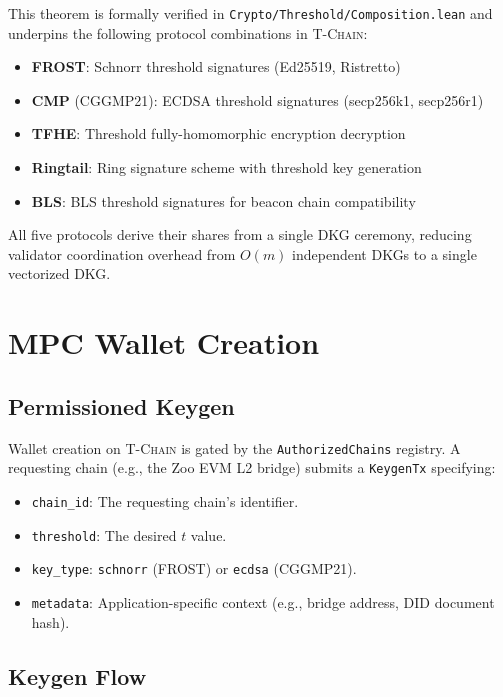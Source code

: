 \documentclass[11pt,letterpaper]{article}
\theoremstyle{definition}
\theoremstyle{remark}
\newcommand{\TChain}{\textsc{T-Chain}}
\begin{document}
This theorem is formally verified in \texttt{Crypto/Threshold/Composition.lean} and underpins the following protocol combinations in \TChain{}:

\begin{itemize}
\item \textbf{FROST}: Schnorr threshold signatures (Ed25519, Ristretto)
\item \textbf{CMP} (CGGMP21): ECDSA threshold signatures (secp256k1, secp256r1)
\item \textbf{TFHE}: Threshold fully-homomorphic encryption decryption
\item \textbf{Ringtail}: Ring signature scheme with threshold key generation
\item \textbf{BLS}: BLS threshold signatures for beacon chain compatibility
\end{itemize}

All five protocols derive their shares from a single DKG ceremony, reducing validator coordination overhead from $O(m)$ independent DKGs to a single vectorized DKG.

\section{MPC Wallet Creation}
\label{sec:wallet}

\subsection{Permissioned Keygen}

Wallet creation on \TChain{} is gated by the \texttt{AuthorizedChains} registry. A requesting chain (e.g., the Zoo EVM L2 bridge) submits a \texttt{KeygenTx} specifying:

\begin{itemize}
\item \texttt{chain\_id}: The requesting chain's identifier.
\item \texttt{threshold}: The desired $t$ value.
\item \texttt{key\_type}: \texttt{schnorr} (FROST) or \texttt{ecdsa} (CGGMP21).
\item \texttt{metadata}: Application-specific context (e.g., bridge address, DID document hash).
\end{itemize}

\subsection{Keygen Flow}
\end{document}
